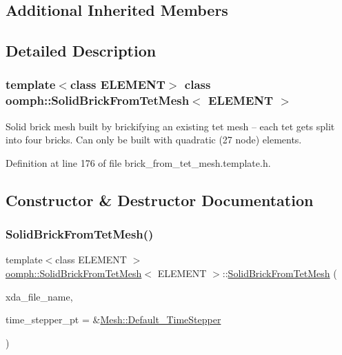 \subsection*{Additional Inherited Members}


\subsection{Detailed Description}
\subsubsection*{template$<$class E\+L\+E\+M\+E\+NT$>$\newline
class oomph\+::\+Solid\+Brick\+From\+Tet\+Mesh$<$ E\+L\+E\+M\+E\+N\+T $>$}

Solid brick mesh built by brickifying an existing tet mesh -- each tet gets split into four bricks. Can only be built with quadratic (27 node) elements. 

Definition at line 176 of file brick\+\_\+from\+\_\+tet\+\_\+mesh.\+template.\+h.



\subsection{Constructor \& Destructor Documentation}
\mbox{\label{classoomph_1_1SolidBrickFromTetMesh_afffe8e29788d8f748fcc6aa9d818420d}} 
\subsubsection{\texorpdfstring{Solid\+Brick\+From\+Tet\+Mesh()}{SolidBrickFromTetMesh()}\hspace{0.1cm}{\footnotesize\ttfamily [1/2]}}
{\footnotesize\ttfamily template$<$class E\+L\+E\+M\+E\+NT $>$ \\
\hyperlink{classoomph_1_1SolidBrickFromTetMesh}{oomph\+::\+Solid\+Brick\+From\+Tet\+Mesh}$<$ E\+L\+E\+M\+E\+NT $>$\+::\hyperlink{classoomph_1_1SolidBrickFromTetMesh}{Solid\+Brick\+From\+Tet\+Mesh} (\begin{DoxyParamCaption}\item[{const std\+::string}]{xda\+\_\+file\+\_\+name,  }\item[{\hyperlink{classoomph_1_1TimeStepper}{Time\+Stepper} $\ast$}]{time\+\_\+stepper\+\_\+pt = {\ttfamily \&\hyperlink{classoomph_1_1Mesh_a12243d0fee2b1fcee729ee5a4777ea10}{Mesh\+::\+Default\+\_\+\+Time\+Stepper}} }\end{DoxyParamCaption})\hspace{0.3cm}{\ttfamily [inline]}}



